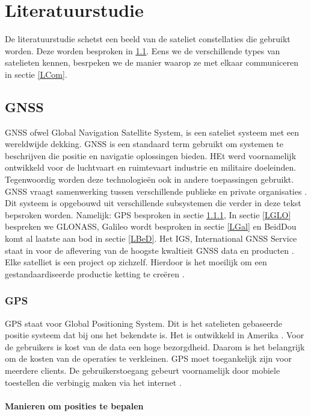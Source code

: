 \chapter{Literatuurstudie}
De literatuurstudie schetst een beeld van de sateliet constellaties die gebruikt worden. Deze worden besproken in \ref{LGNS}. Eens we de verschillende types van satelieten kennen, besrpeken we de manier waarop ze met elkaar communiceren in sectie \ref{LCom}.

\section{GNSS}
\label{LGNS}
GNSS ofwel Global Navigation Satellite System, is een sateliet systeem met een wereldwijde dekking. GNSS is een standaard term gebruikt om systemen te beschrijven die positie en navigatie oplossingen bieden. HEt werd voornamelijk ontwikkeld voor de luchtvaart en ruimtevaart industrie en militaire doeleinden. Tegenwoordig worden deze technologieën ook in andere toepassingen gebruikt. GNSS vraagt samenwerking tussen verschillende publieke en private organisaties \cite{LBibGNSS3}.  Dit systeem is opgebouwd uit verschillende subsystemen die verder in deze tekst bepsroken worden. Namelijk: GPS besproken in sectie \ref{LGPS}, In sectie \ref{LGLO} bespreken we GLONASS, Galileo wordt besproken in sectie \ref{LGal} en BeidDou komt al laatste aan bod in sectie \ref{LBeD}. Het IGS, International GNSS Service staat in voor de aflevering van de hoogste kwaltieit GNSS data en producten \cite{LBibGNSS}. Elke satelliet is een project op zichzelf. Hierdoor is het moeilijk om een gestandaardiseerde productie ketting te creëren \cite{LBibGNSS3}.

\subsection{GPS}
\label{LGPS} 
GPS staat voor Global Positioning System. Dit is het satelieten gebaseerde positie systeem dat bij ons het bekendste is. Het is ontwikkeld in Amerika \cite{LBibGNSS}\cite{LBibGNSS3}. Voor de gebruikers is kost van de data een hoge bezorgdheid. Daarom is het belangrijk om de kosten van de operaties te verkleinen. GPS moet toegankelijk zijn voor meerdere clients. De gebruikerstoegang gebeurt voornamelijk door mobiele toestellen die verbingig maken via het internet \cite{LBibGPS}.

\subsubsection{Manieren om posities te bepalen}
